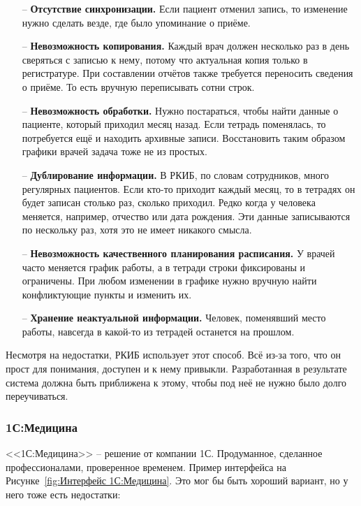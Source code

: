 \documentclass[a4paper,article]{article}
\begin{document}
\begin{sloppypar}
        \begin{itemize}[nolistsep]
            \item[--] \textbf{Отсутствие синхронизации.} Если пациент отменил запись, то изменение нужно сделать везде, где было упоминание о приёме.
            \item[--] \textbf{Невозможность копирования.} Каждый врач должен несколько раз в день сверяться с записью к нему, потому что актуальная копия только в регистратуре. При составлении отчётов также требуется переносить сведения о приёме. То есть вручную переписывать сотни строк.
            \item[--] \textbf{Невозможность обработки.} Нужно постараться, чтобы найти данные о пациенте, который приходил месяц назад. Если тетрадь поменялась, то потребуется ещё и находить архивные записи. Восстановить таким образом графики врачей задача тоже не из простых.
            \item[--] \textbf{Дублирование информации.} В РКИБ, по словам сотрудников, много регулярных пациентов. Если кто-то приходит каждый месяц, то в тетрадях он будет записан столько раз, сколько приходил. Редко когда у человека меняется, например, отчество или дата рождения. Эти данные записываются по нескольку раз, хотя это не имеет никакого смысла.
            \item[--] \textbf{Невозможность качественного планирования расписания.} У врачей часто меняется график работы, а в тетради строки фиксированы и ограничены. При любом изменении в графике нужно вручную найти конфликтующие пункты и изменить их.
            \item[--] \textbf{Хранение неактуальной информации.} Человек, поменявший место работы, навсегда в какой-то из тетрадей останется на прошлом.
        \end{itemize}

        Несмотря на недостатки, РКИБ использует этот способ. Всё из-за того, что он прост для понимания, доступен и к нему привыкли. Разработанная в результате система должна быть приближена к этому, чтобы под неё не нужно было долго переучиваться.

    \subsubsection{1С:Медицина}

        <<1С:Медицина>> -- решение от компании 1С. Продуманное, сделанное профессионалами, проверенное временем. Пример интерфейса на Рисунке~\ref{fig:Интерфейс 1С:Медицина}. Это мог бы быть хороший вариант, но у него тоже есть недостатки:


\end{sloppypar}
\end{document}
